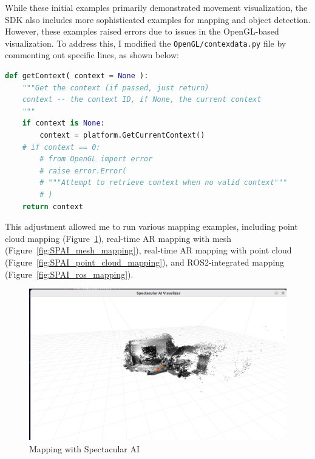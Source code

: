 While these initial examples primarily demonstrated movement visualization, the SDK also includes more sophisticated examples for mapping and object detection. However, these examples raised errors due to issues in the OpenGL-based visualization. To address this, I modified the \verb|OpenGL/contexdata.py| file by commenting out specific lines, as shown below:

\begin{lstlisting}[language=python,frame=single,float=!ht]
def getContext( context = None ):
    """Get the context (if passed, just return)
    context -- the context ID, if None, the current context
    """
    if context is None:
        context = platform.GetCurrentContext()
    # if context == 0:
        # from OpenGL import error
        # raise error.Error(
        # """Attempt to retrieve context when no valid context"""
        # )
    return context
\end{lstlisting}
\FloatBarrier

This adjustment allowed me to run various mapping examples, including point cloud mapping (Figure~\ref{fig:SPAI_mapping}), real-time AR mapping with mesh (Figure~\ref{fig:SPAI_mesh_mapping}), real-time AR mapping with point cloud (Figure~\ref{fig:SPAI_point_cloud_mapping}), and ROS2-integrated mapping (Figure~\ref{fig:SPAI_ros_mapping}).

\begin{figure}[htbp]
	\centering
	\includegraphics[width=150mm, keepaspectratio]{figures/spectacular_ai_mapping_visu.png}
	\caption{Mapping with Spectacular AI}
	\label{fig:SPAI_mapping}
\end{figure}

